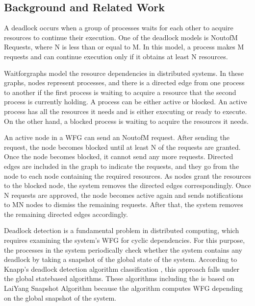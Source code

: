 \documentclass[letterpaper,10pt,english]{sphinxmanual}
\begin{document}
\subsection{Background and Related Work}
\label{\detokenize{docs/BrachaToueg/algorithm:background-and-related-work}}
\sphinxAtStartPar
A deadlock occurs when a group of processes waits for each other to acquire resources to continue their execution. One of the deadlock models is N\sphinxhyphen{}out\sphinxhyphen{}of\sphinxhyphen{}M Requests, where N is less than or equal to M. In this model, a process makes M requests and can continue execution only if it obtains at least N resources.

\sphinxAtStartPar
Wait\sphinxhyphen{}for\sphinxhyphen{}graphs model the resource dependencies in distributed systems.  In these graphs, nodes represent processes, and there is a directed edge from one process to another if the first process is waiting to acquire a resource that the second process is currently holding. A process can be either active or blocked. An active process has all the resources it needs and is either executing or ready to execute. On the other hand, a blocked process is waiting to acquire the resources it needs.

\sphinxAtStartPar
An active node in a WFG can send an N\sphinxhyphen{}out\sphinxhyphen{}of\sphinxhyphen{}M request. After sending the request, the node becomes blocked until at least N of the requests are granted. Once the node becomes blocked, it cannot send any more requests. Directed edges are included in the graph to indicate the requests, and they go from the node to each node containing the required resources. As nodes grant the resources to the blocked node, the system removes the directed edges correspondingly. Once N requests are approved, the node becomes active again and sends notifications to M\sphinxhyphen{}N nodes to dismiss the remaining requests. After that, the system removes the remaining directed edges accordingly.  

\sphinxAtStartPar
Deadlock detection is a fundamental problem in distributed computing, which requires examining the system’s WFG for cyclic dependencies. For this purpose, the processes in the system periodically check whether the system contains any deadlock by taking a snapshot of the global state of the system.  According to Knapp’s deadlock detection algorithm classification , this approach falls under the global state\sphinxhyphen{}based algorithms. These algorithms including the {\hyperref[\detokenize{docs/BrachaToueg/algorithm:brachatouegdeadlockdetectionalgorithm}]{}} is based on Lai\sphinxhyphen{}Yang Snapshot Algorithm  because the algorithm computes WFG depending on the global snapshot of the system.
\end{document}
